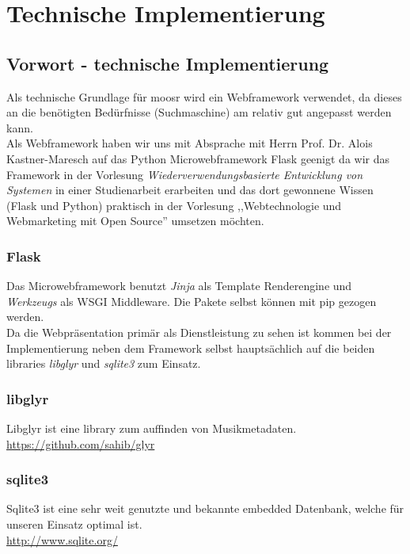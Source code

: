 \chapter{Technische Implementierung}

\section{Vorwort - technische Implementierung}
Als technische Grundlage für moosr wird ein Webframework verwendet, da dieses an
die benötigten Bedürfnisse (Suchmaschine) am relativ gut angepasst werden kann.
\\
Als Webframework haben wir uns mit Absprache mit Herrn Prof. Dr. Alois
Kastner-Maresch auf das Python Microwebframework Flask geenigt da wir das
Framework in der Vorlesung \emph{Wiederverwendungsbasierte Entwicklung von
Systemen} in einer Studienarbeit erarbeiten und das dort gewonnene Wissen (Flask
und Python) praktisch in der Vorlesung ,,Webtechnologie und Webmarketing 
mit Open Source'' umsetzen möchten.

\subsection{Flask}
Das Microwebframework benutzt \emph{Jinja} als Template Renderengine und
\emph{Werkzeugs} als WSGI Middleware. Die Pakete selbst können mit pip gezogen
werden.
\\
Da die Webpräsentation primär als Dienstleistung zu sehen ist kommen bei der
Implementierung neben dem Framework selbst hauptsächlich auf die beiden
libraries \emph{libglyr} und \emph{sqlite3} zum Einsatz.

\subsection{libglyr}
Libglyr ist eine library zum auffinden von Musikmetadaten. 
\\
\url{https://github.com/sahib/glyr}

\subsection{sqlite3}
Sqlite3 ist eine sehr weit genutzte und bekannte embedded Datenbank, welche für
unseren Einsatz optimal ist.
\\
\url{http://www.sqlite.org/}

